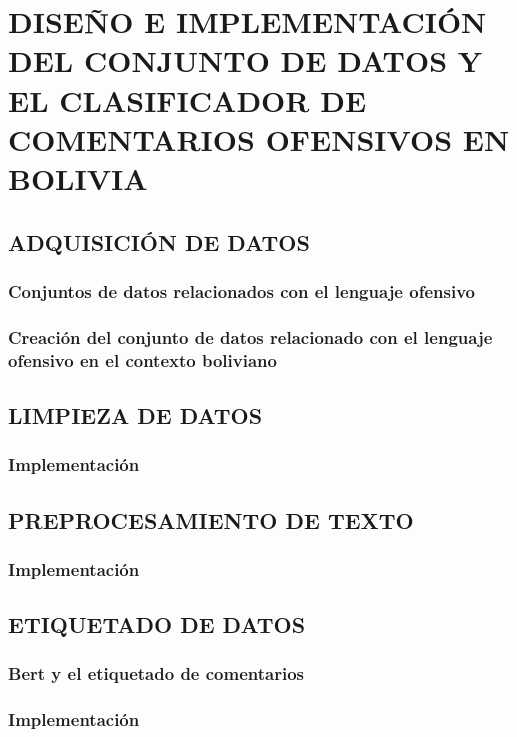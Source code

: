 \chapter{DISEÑO E IMPLEMENTACIÓN DEL CONJUNTO DE DATOS Y EL CLASIFICADOR DE COMENTARIOS OFENSIVOS EN BOLIVIA}\label{chp-resfttx}


\section{ADQUISICIÓN DE DATOS}

\subsection{Conjuntos de datos relacionados con el lenguaje ofensivo}

\subsection{Creación del conjunto de datos relacionado con el lenguaje ofensivo en el contexto boliviano}

\section{LIMPIEZA DE DATOS}

\subsection{Implementación}

\section{PREPROCESAMIENTO DE TEXTO}

\subsection{Implementación}




\section{ETIQUETADO DE DATOS}

\subsection{Bert y el etiquetado de comentarios}

\subsection{Implementación}

